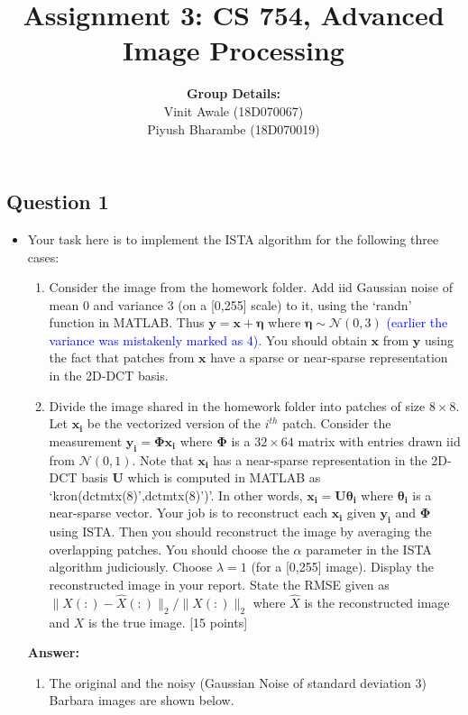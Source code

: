 \documentclass[12pt]{article}
\title{Assignment 3: CS 754, Advanced Image Processing}
\author{\textbf{Group Details:} \\
Vinit Awale (18D070067)\\ 
Piyush Bharambe (18D070019)
}
\date{}
\begin{document}
\maketitle
\begin{center}
    \section*{Question 1}
\end{center}

\begin{itemize}
    \item Your task here is to implement the ISTA algorithm for the following three cases:
\begin{enumerate}
\item Consider the image from the homework folder. Add iid Gaussian noise of mean 0 and variance 3 (on a [0,255] scale) to it, using the `randn' function in MATLAB. Thus $\boldsymbol{y} = \boldsymbol{x} + \boldsymbol{\eta}$ where $\boldsymbol{\eta} \sim \mathcal{N}(0,3)$ \textcolor{blue}{(earlier the variance was mistakenly marked as 4)}. You should obtain $\boldsymbol{x}$ from $\boldsymbol{y}$ using the fact that patches from $\boldsymbol{x}$ have a sparse or near-sparse representation in the 2D-DCT basis. 
\item Divide the image shared in the homework folder into patches of size $8 \times 8$. Let $\boldsymbol{x_i}$ be the vectorized version of the $i^{th}$ patch. Consider the measurement $\boldsymbol{y_i} = \boldsymbol{\Phi x_i}$ where $\boldsymbol{\Phi}$ is a $32 \times 64$ matrix with entries drawn iid from $\mathcal{N}(0,1)$. Note that $\boldsymbol{x_i}$ has a near-sparse representation in the 2D-DCT basis $\boldsymbol{U}$ which is computed in MATLAB as `kron(dctmtx(8)',dctmtx(8)')'. In other words, $\boldsymbol{x_i} = \boldsymbol{U \theta_i}$ where $\boldsymbol{\theta_i}$ is a near-sparse vector. Your job is to reconstruct each $\boldsymbol{x_i}$ given $\boldsymbol{y_i}$ and $\boldsymbol{\Phi}$ using ISTA. Then you should reconstruct the image by averaging the overlapping patches. You should choose the $\alpha$ parameter in the ISTA algorithm judiciously. Choose $\lambda = 1$ (for a [0,255] image). Display the reconstructed image in your report. State the RMSE given as $\|X(:)-\hat{X}(:)\|_2/\|X(:)\|_2$ where $\hat{X}$ is the reconstructed image and $X$ is the true image. \textsf{[15 points]}
\end{enumerate}
\textbf{Answer:}
\begin{enumerate}
    \item The original and the noisy (Gaussian Noise of standard deviation 3) Barbara images are shown below.

\end{enumerate}
\end{itemize}
\end{document}
